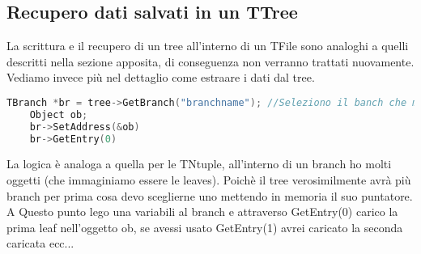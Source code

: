 \subsection{Recupero dati salvati in un TTree}
La scrittura  e il recupero di un tree all'interno di un TFile sono analoghi a quelli descritti nella sezione apposita, di conseguenza non verranno trattati nuovamente. Vediamo invece più nel dettaglio come estraare i dati dal tree.
\begin{lstlisting}[language=C++,label={cod1},mathescape=true,breaklines=true]
	TBranch *br = tree->GetBranch("branchname"); //Seleziono il banch che mi interessa
	Object ob;
	br->SetAddress(&ob)
	br->GetEntry(0)
\end{lstlisting}
La logica è analoga a quella per le TNtuple, all'interno di un branch ho molti oggetti (che immaginiamo essere le leaves). Poichè il tree verosimilmente avrà più branch per prima cosa devo sceglierne uno mettendo in memoria il suo puntatore. A Questo punto lego una variabili al branch e attraverso GetEntry(0) carico la prima leaf nell'oggetto ob, se avessi usato GetEntry(1) avrei caricato la seconda caricata ecc...
